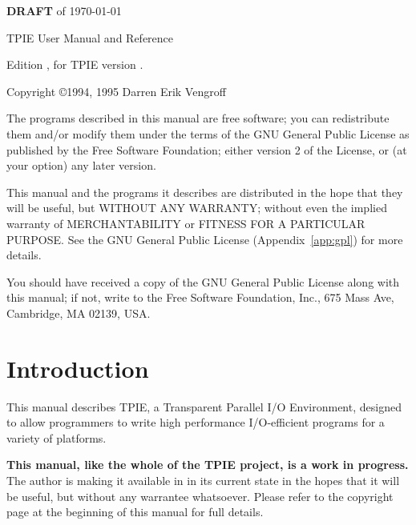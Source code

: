 \begin{titlepage}

\vspace*{5 ex}

\centerline{\Large {\bf DRAFT} of \today}

\vspace{\fill}


\noindent TPIE User Manual and Reference

\noindent Edition \edition, for TPIE version \version.

\vspace{2 ex}

\noindent Copyright \copyright 1994, 1995 Darren Erik Vengroff

\vspace{2 ex}

The programs described in this manual are free software; you can
redistribute them and/or modify them under the terms of the GNU General
Public License as published by the Free Software Foundation; either
version 2 of the License, or (at your option) any later version.

This manual and the programs it describes are distributed in the hope
that they will be useful, but WITHOUT ANY WARRANTY; without even the
implied warranty of MERCHANTABILITY or FITNESS FOR A PARTICULAR
PURPOSE.  See the GNU General Public License (Appendix~\ref{app:gpl})
for more details.

You should have received a copy of the GNU General Public License
along with this manual; if not, write to the Free Software Foundation,
Inc., 675 Mass Ave, Cambridge, MA 02139, USA.
\end{titlepage}

\tableofcontents

\chapter*{Introduction}

This manual describes TPIE, a Transparent Parallel I/O Environment,
designed to allow programmers to write high performance I/O-efficient
programs for a variety of platforms.

{\bf This manual, like the whole of the TPIE project, is a work in
  progress.}  The author is making it available in in its current state
in the hopes that it will be useful, but without any warrantee
whatsoever.  Please refer to the copyright page at the beginning of
this manual for full details.


